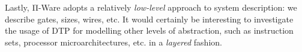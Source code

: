             Lastly, Π-Ware adopts a relatively \emph{low-level} approach to system description:
            we describe gates, sizes, wires, etc. It would certainly be interesting to investigate
            the usage of \acl{DTP} for modelling other levels of abstraction, such as
            instruction sets, processor microarchitectures, etc. in a \emph{layered} fashion.

